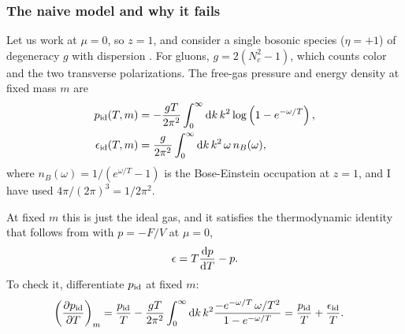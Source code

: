 \subsubsection{The naive model and why it fails}

Let us work at $\mu=0$, so $z=1$, and consider a single bosonic
species ($\eta=+1$) of degeneracy $g$ with dispersion
. For gluons, $g=2(N_c^2-1)$, which counts
color and the two transverse polarizations. The free-gas pressure and energy
density at fixed mass $m$ are
\begin{equation}\begin{aligned}\label{eq:qpideal}
  p_{\rm id}(T,m)&=-\frac{gT}{2\pi^2}\int_0^\infty\dd{k}k^2
      \log\left(1-e^{-\omega/T}\right),\\
  \epsilon_{\rm id}(T,m)&=\frac{g}{2\pi^2}\int_0^\infty\dd{k}k^2
      \,\omega\, n_B(\omega),
\end{aligned}\end{equation}
where $n_B(\omega)=1/(e^{\omega/T}-1)$ is the Bose-Einstein occupation
 at $z=1$, and I have used
$4\pi/(2\pi)^3=1/2\pi^2$.

At fixed $m$ this is just the ideal gas, and it satisfies the
thermodynamic identity that follows from  with
$p=-F/V$ at $\mu=0$,
\begin{equation}\label{eq:qpconsistency}
  \epsilon=T\dv{p}{T}-p.
\end{equation}
To check it, differentiate $p_{\rm id}$ at fixed $m$:
\begin{equation}\begin{aligned}\label{eq:qpfixedm}
  \left(\pdv{p_{\rm id}}{T}\right)_{m}
    &=\frac{p_{\rm id}}{T}-\frac{gT}{2\pi^2}\int_0^\infty\dd{k}k^2
      \frac{-e^{-\omega/T}\,\omega/T^2}{1-e^{-\omega/T}}
    =\frac{p_{\rm id}}{T}+\frac{\epsilon_{\rm id}}{T}.
\end{aligned}\end{equation}


